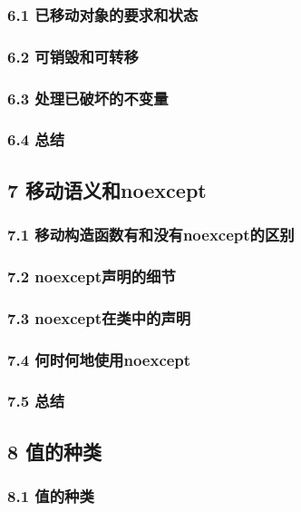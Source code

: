 \documentclass[11pt,a4paper,UTF8]{ctexart}
\begin{document}
		\subsubsection{6.1 已移动对象的要求和状态}
		
		\subsubsection{6.2 可销毁和可转移}
		
		\subsubsection{6.3 处理已破坏的不变量}
		
		\subsubsection{6.4 总结}
		
	\subsection{7 移动语义和noexcept}
	
		\subsubsection{7.1 移动构造函数有和没有noexcept的区别}
		
		\subsubsection{7.2 noexcept声明的细节}
		
		\subsubsection{7.3 noexcept在类中的声明}
		
		\subsubsection{7.4 何时何地使用noexcept}
		
		\subsubsection{7.5 总结}
		
	\subsection{8 值的种类}
	
		\subsubsection{8.1 值的种类}
		
\end{document}
